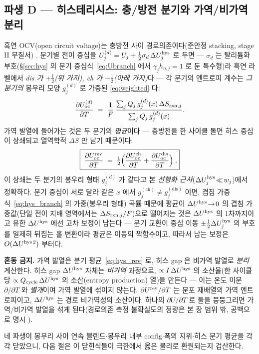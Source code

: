 \subsection{파생 D --- 히스테리시스: 충/방전 분기와 가역/비가역 분리}\label{ssec:hys}
흑연 OCV(open circuit voltage)는 충방전 사이 경로의존이다(준안정 stacking, stage II 무질서)
\cite{hysteresis2018}. 분기별 전이 중심을 $U_j^{(d)}=U_j+\tfrac12\sigma_d\,\Delta U_j^{\mathrm{hys}}$ 로 두면 --- $\sigma_d$
는 탈리튬화 부호(\S\ref{sec:hys} 의 분기 중심식~\eqref{eq:Ubranch} 에서 $\gamma_jh_{\eta,j}{=}1$ 로 둔 특수형)라 흑연 라벨에서 \emph{dis 가
$+\tfrac12$(위 가지), ch 가 $-\tfrac12$(아래 가지)}다 --- 각 분기의 엔트로피 계수는 \emph{그 분기의} 봉우리
모양 $g_j^{(d)}$ 로 가중된 \eqref{eq:weighted} 다:
\begin{equation}
\frac{\partial U_{\mathrm{oc}}^{(d)}}{\partial T}
\;=\;\frac1F\,\frac{\sum_j Q_j\,g_j^{(d)}(x)\,\Delta S_{\mathrm{rxn},j}}{\sum_j Q_j\,g_j^{(d)}(x)}.
\label{eq:hys_branch}
\end{equation}
가역 발열에 들어가는 것은 두 분기의 \emph{평균}이다 --- 충방전을 한 사이클 돌면 히스 중심이 상쇄되고 열역학적
$\Delta S$ 만 남기 때문이다:
\begin{equation}
\boxed{\;\frac{\partial U_{\mathrm{oc}}^{\mathrm{rev}}}{\partial T}
\;=\;\tfrac12\Bigl(\frac{\partial U_{\mathrm{oc}}^\mathrm{ch}}{\partial T}+\frac{\partial U_{\mathrm{oc}}^\mathrm{dis}}{\partial T}\Bigr)\;.}
\label{eq:hys_rev}
\end{equation}
이 상쇄는 두 분기의 봉우리 형태 $g_j^{(d)}$ 가 같다고 본 \emph{선형화 근사}($\Delta U_j^{\mathrm{hys}}\!\ll\!w_j$)에서
정확하다. 분기 중심이 서로 달라 같은 $x$ 에서 $g_j^{(\mathrm{ch})}\!\ne\!g_j^{(\mathrm{dis})}$ 이면, 겹침
가중식~\eqref{eq:hys_branch} 의 가중(봉우리 형태) 곡률 때문에 평균이 $\Delta U^{\mathrm{hys}}\!\to\!0$ 의 겹침
가중값(단일 전이 지배 영역에서는 $\Delta S_{\mathrm{rxn},j}/F$)으로 떨어지는 것은 $\Delta U^{\mathrm{hys}}$ 의 1차까지이고
유한 $\Delta U^{\mathrm{hys}}$ 에선 고차 보정이 남는다 --- 분기 교환이 중심 이동 $\pm\tfrac12\Delta U_j^{\mathrm{hys}}$ 의 부호를
일제히 뒤집는 홀 변환이라 평균은 이동의 짝함수이고, 따라서 남는 보정은 $O(\Delta U^{\mathrm{hys}\,2})$ 부터다.
\begin{warnbox}
\textbf{혼동 금지.} 가역 발열은 분기 평균~\eqref{eq:hys_rev} 로, 히스 gap 은 비가역 발열로 \emph{분리} 계산한다.
히스 gap $\Delta U^{\mathrm{hys}}$ 자체는 \emph{비가역} 과정으로, $\propto I\,\Delta U^{\mathrm{hys}}$ 의 소산율(한 사이클당
$\propto Q_\mathrm{cycle}\,\Delta U^{\mathrm{hys}}$ 의 소산(entropy production) 열)을 만든다 --- 이는 온도 미분
$\partial/\partial T$ 와 \emph{별개}이며 가역 발열에 섞이지 않는다. $\partial U^{\mathrm{rev}}/\partial T$ 는 분포 재배열의
가역 엔트로피이고, $\Delta U^{\mathrm{hys}}$ 는 경로 비가역성의 소산이다. 하나의 $\partial U/\partial T$ 로 둘을
뭉뚱그리면 가역/비가역 발열을 섞게 된다(경로의존 측정 불확실도의 정량은 본 장 범위 밖, 공백으로 명시
\cite{hysteresis2018}).
\end{warnbox}
네 파생이 봉우리 사이 연속 블렌드$\cdot$봉우리 내부 config$\cdot$폭의 지위$\cdot$히스 분기 평균을 각각 닫았으니,
다음 절은 이 닫힌식들이 극한에서 옳은 물리로 환원되는지 검산한다.

